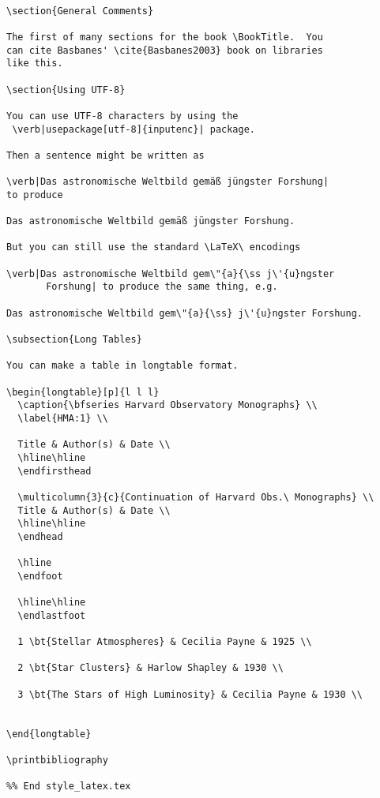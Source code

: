 \begin{verbatim}

\section{General Comments}

The first of many sections for the book \BookTitle.  You
can cite Basbanes' \cite{Basbanes2003} book on libraries
like this.

\section{Using UTF-8}

You can use UTF-8 characters by using the
 \verb|usepackage[utf-8]{inputenc}| package.

Then a sentence might be written as

\verb|Das astronomische Weltbild gemäß jüngster Forshung|
to produce

Das astronomische Weltbild gemäß jüngster Forshung.

But you can still use the standard \LaTeX\ encodings

\verb|Das astronomische Weltbild gem\"{a}{\ss j\'{u}ngster
       Forshung| to produce the same thing, e.g.

Das astronomische Weltbild gem\"{a}{\ss} j\'{u}ngster Forshung.

\subsection{Long Tables}

You can make a table in longtable format.

\begin{longtable}[p]{l l l}
  \caption{\bfseries Harvard Observatory Monographs} \\
  \label{HMA:1} \\

  Title & Author(s) & Date \\
  \hline\hline
  \endfirsthead

  \multicolumn{3}{c}{Continuation of Harvard Obs.\ Monographs} \\
  Title & Author(s) & Date \\
  \hline\hline
  \endhead

  \hline
  \endfoot
  
  \hline\hline
  \endlastfoot

  1 \bt{Stellar Atmospheres} & Cecilia Payne & 1925 \\

  2 \bt{Star Clusters} & Harlow Shapley & 1930 \\

  3 \bt{The Stars of High Luminosity} & Cecilia Payne & 1930 \\

  
\end{longtable}

\printbibliography

%% End style_latex.tex
\end{verbatim}

